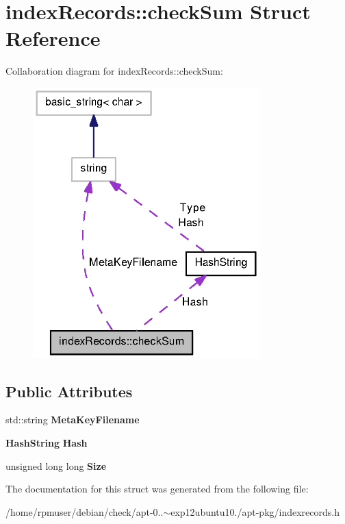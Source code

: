 \section{index\-Records\-:\-:check\-Sum \-Struct \-Reference}
\label{structindexRecords_1_1checkSum}


\-Collaboration diagram for index\-Records\-:\-:check\-Sum\-:
\nopagebreak
\begin{figure}[H]
\begin{center}
\leavevmode
\includegraphics[width=248pt]{structindexRecords_1_1checkSum__coll__graph}
\end{center}
\end{figure}
\subsection*{\-Public \-Attributes}
\begin{DoxyCompactItemize}
\item 
std\-::string {\bfseries \-Meta\-Key\-Filename}\label{structindexRecords_1_1checkSum_aaf04a75ffa5003fc7cb7ebaf1981e9f3}

\item 
{\bf \-Hash\-String} {\bfseries \-Hash}\label{structindexRecords_1_1checkSum_af563e1a5581fdd126be0406568fda04b}

\item 
unsigned long long {\bfseries \-Size}\label{structindexRecords_1_1checkSum_a254f9ca5c1e1232788dedebd142044aa}

\end{DoxyCompactItemize}


\-The documentation for this struct was generated from the following file\-:\begin{DoxyCompactItemize}
\item 
/home/rpmuser/debian/check/apt-\/0..$\sim$exp12ubuntu10./apt-\/pkg/indexrecords.\-h\end{DoxyCompactItemize}
